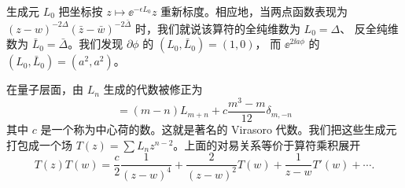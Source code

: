 生成元 $L_0$ 把坐标按 $z\mapsto \ee^{-\epsilon L_0}z$ 重新标度。相应地，当两点函数表现为
$(z-w)^{-2\Delta}(\bar z-\bar w)^{-2\bar\Delta}$ 时，我们就说该算符的全纯维数为 $L_0=\Delta$、
反全纯维数为 $\bar L_0=\bar\Delta$。我们发现 $\partial\phi$ 的 $(L_0,\bar L_0)=(1,0)$，
而 $\ee^{2\ii a\phi}$ 的 $(L_0,\bar L_0)=(a^2,a^2)$。




在量子层面，由 $L_n$ 生成的代数被修正为
\begin{equation}
  [L_m,L_n] = (m-n)L_{m+n} + c\frac{m^3-m}{12}\delta_{m,-n}
  \tag{2.35}
\end{equation}
其中 $c$ 是一个称为中心荷的数。这就是著名的 Virasoro 代数。我们把这些生成元打包成一个场
$T(z)=\sum L_n z^{n-2}$。上面的对易关系等价于算符乘积展开
\begin{equation}
  T(z)T(w) = \frac{c}{2}\frac{1}{(z-w)^4} + \frac{2}{(z-w)^2}T(w) + \frac{1}{z-w}T'(w) + \cdots .
  \tag{2.36}
\end{equation}

